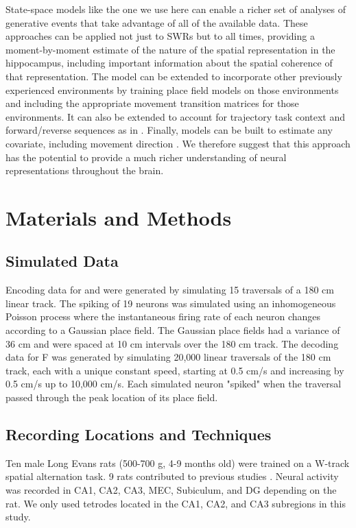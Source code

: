 \documentclass[9pt,lineno]{elife}
\begin{document}
State-space models like the one we use here can enable a richer set of analyses of generative events that take advantage of all of the available data. These approaches can be applied not just to SWRs but to all times, providing a moment-by-moment estimate of the nature of the spatial representation in the hippocampus, including important information about the spatial coherence of that representation. The model can be extended to incorporate other previously experienced environments by training place field models on those environments and including the appropriate movement transition matrices for those environments. It can also be extended to account for trajectory task context and forward/reverse sequences as in \cite{DengRapidclassificationhippocampal2016}. Finally, models can be built to estimate any covariate, including movement direction \citep{KayConstantSubsecondCycling2020}. We therefore suggest that this approach has the potential to provide a much richer understanding of neural representations throughout the brain. 

\section*{Materials and Methods}

\subsection*{Simulated Data}
Encoding data for  and  were generated by simulating 15 traversals of a 180 cm linear track. The spiking of 19 neurons was simulated using an inhomogeneous Poisson process where the instantaneous firing rate of each neuron changes according to a Gaussian place field. The Gaussian place fields had a variance of 36 cm and were spaced at 10 cm intervals over the 180 cm track. The decoding data for F was generated by simulating 20,000 linear traversals of the 180 cm track, each with a unique constant speed, starting at 0.5 cm/s and increasing by 0.5 cm/s up to 10,000 cm/s. Each simulated neuron "spiked" when the traversal passed through the peak location of its place field.

\subsection*{Recording Locations and Techniques}
Ten male Long Evans rats (500-700 g, 4-9 months old) were trained on a W-track spatial alternation task. 9 rats contributed to previous studies \citep{KarlssonAwakereplayremote2009, KayConstantSubsecondCycling2020, Kayhippocampalnetworkspatial2016, CarrTransientSlowGamma2012}. Neural activity was recorded in CA1, CA2, CA3, MEC, Subiculum, and DG depending on the rat. We only used tetrodes located in the CA1, CA2, and CA3 subregions in this study.
\end{document}
